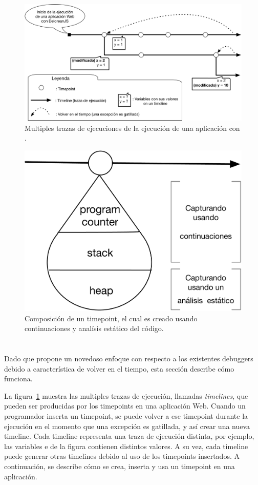 \documentclass[conference]{IEEEtran}
\begin{document}

\bigskip

\begin{figure}[t]
\begin{center}
\includegraphics[width=.7\linewidth]{fig-timeline}
\caption{Multiples trazas de ejecuciones de la ejecuci\'on de una aplicaci\'on con \deloreanjs.}
\label{fig:timeline}
\end{center}
\end{figure}


\begin{figure}[t]
\begin{center}
\includegraphics[width=.55\linewidth]{fig-timepoint}
\caption{Composici\'on de un timepoint, el cual es creado usando continuaciones y anal\'isis est\'atico del c\'odigo.}
\label{fig:timepoint}
\end{center}
\end{figure}


\section{\deloreanjs}
\label{sec:deloreanjs}

Dado que \deloreanjs propone un novedoso enfoque con respecto a los existentes debuggers debido a caracter\'istica de volver en el tiempo, esta secci\'on describe c\'omo funciona. 

\smallskip

La figura~\ref{fig:timeline} muestra las multiples trazas de ejecuci\'on, llamadas {\em timelines}, que pueden ser producidas por los timepoints en una aplicaci\'on Web. Cuando un programador inserta un timepoint, se puede volver a ese timepoint durante la ejecuci\'on en el momento que una excepci\'on es gatillada, y as\'i crear una nueva timeline. Cada timeline representa una traza de ejecuci\'on distinta, por ejemplo, las variables  e  de la figura contienen distintos valores. A su vez, cada timeline puede generar otras timelines debido al uso de los timepoints insertados. A continuaci\'on, se describe c\'omo se crea, inserta y usa un timepoint en una aplicaci\'on.  
\end{document}
